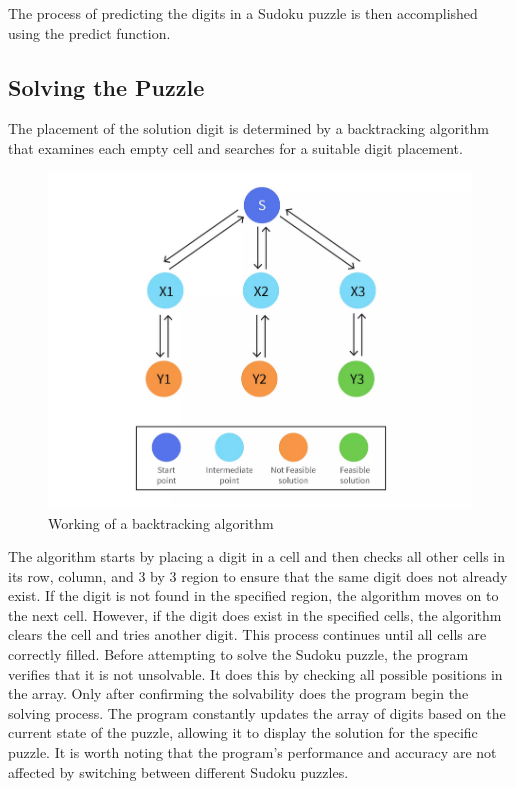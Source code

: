 \documentclass[conference]{IEEEtran}
\begin{document}
The process of predicting the digits in a Sudoku puzzle is then accomplished using the predict function.

\subsection{Solving the Puzzle}\label{solving_puzzle}
The placement of the solution digit is determined by a backtracking algorithm that examines each empty cell and searches for a suitable digit placement.
\begin{figure}[htbp]
\centerline{\includegraphics[scale=0.3]{assets/backtracking.png}}
\caption{Working of a backtracking algorithm}
\label{backtracking_algo}
\end{figure}

The algorithm starts by placing a digit in a cell and then checks all other cells in its row, column, and 3 by 3 region to ensure that the same digit does not already exist. If the digit is not found in the specified region, the algorithm moves on to the next cell. However, if the digit does exist in the specified cells, the algorithm clears the cell and tries another digit. This process continues until all cells are correctly filled. Before attempting to solve the Sudoku puzzle, the program verifies that it is not unsolvable. It does this by checking all possible positions in the array. Only after confirming the solvability does the program begin the solving process. The program constantly updates the array of digits based on the current state of the puzzle, allowing it to display the solution for the specific puzzle. It is worth noting that the program's performance and accuracy are not affected by switching between different Sudoku puzzles.
\end{document}
